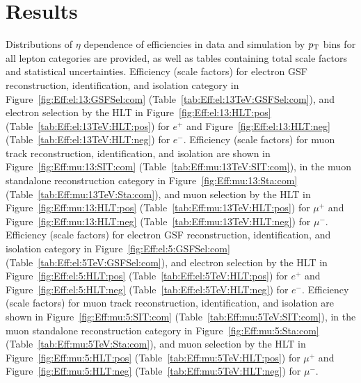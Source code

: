\section{Results}\label{ch:eff:results}
Distributions of $\eta$ dependence of efficiencies in data and simulation by $p_{\mathrm{T}}$ bins for all lepton categories are provided, as well as tables containing total scale factors and statistical uncertainties. Efficiency (scale factors) for \serah electron GSF reconstruction, identification, and isolation category in Figure~\ref{fig:Eff:el:13:GSFSel:com} (Table~\ref{tab:Eff:el:13TeV:GSFSel:com}), and electron selection by the HLT in Figure~\ref{fig:Eff:el:13:HLT:pos} (Table~\ref{tab:Eff:el:13TeV:HLT:pos}) for $e^+$ and Figure~\ref{fig:Eff:el:13:HLT:neg} (Table~\ref{tab:Eff:el:13TeV:HLT:neg}) for $e^-$.  Efficiency (scale factors) for \serah muon track reconstruction, identification, and isolation are shown in Figure~\ref{fig:Eff:mu:13:SIT:com} (Table~\ref{tab:Eff:mu:13TeV:SIT:com}), in the muon standalone reconstruction category in Figure~\ref{fig:Eff:mu:13:Sta:com} (Table~\ref{tab:Eff:mu:13TeV:Sta:com}), and muon selection by the HLT in Figure~\ref{fig:Eff:mu:13:HLT:pos} (Table~\ref{tab:Eff:mu:13TeV:HLT:pos}) for $\mu^+$ and Figure~\ref{fig:Eff:mu:13:HLT:neg} (Table~\ref{tab:Eff:mu:13TeV:HLT:neg}) for $\mu^-$.
 Efficiency (scale factors) for \serag electron GSF reconstruction, identification, and isolation category in Figure~\ref{fig:Eff:el:5:GSFSel:com} (Table~\ref{tab:Eff:el:5TeV:GSFSel:com}), and electron selection by the HLT in Figure~\ref{fig:Eff:el:5:HLT:pos} (Table~\ref{tab:Eff:el:5TeV:HLT:pos}) for $e^+$ and Figure~\ref{fig:Eff:el:5:HLT:neg} (Table~\ref{tab:Eff:el:5TeV:HLT:neg}) for $e^-$.  Efficiency (scale factors) for \serag muon track reconstruction, identification, and isolation are shown in Figure~\ref{fig:Eff:mu:5:SIT:com} (Table~\ref{tab:Eff:mu:5TeV:SIT:com}), in the muon standalone reconstruction category in Figure~\ref{fig:Eff:mu:5:Sta:com} (Table~\ref{tab:Eff:mu:5TeV:Sta:com}), and muon selection by the HLT in Figure~\ref{fig:Eff:mu:5:HLT:pos} (Table~\ref{tab:Eff:mu:5TeV:HLT:pos}) for $\mu^+$ and Figure~\ref{fig:Eff:mu:5:HLT:neg} (Table~\ref{tab:Eff:mu:5TeV:HLT:neg}) for $\mu^-$.





